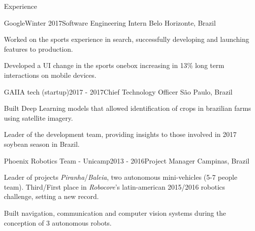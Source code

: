 \documentclass[8pt]{resume}
\newcommand{\tit}[1]{\textit{#1}}
\begin{document}
\begin{rSection}{Experience}

\begin{rSubsection}{Google}{Winter 2017}{Software Engineering Intern}
    {Belo Horizonte, Brazil}
    \item Worked on the sports experience in search, successfully developing and launching features to production.
    \item Developed a UI change in the sports onebox increasing in 13\% long term interactions on mobile devices.
\end{rSubsection}

\begin{rSubsection}{GAIIA tech (startup)}{2017 - 2017}{Chief Technology Officer}
    {São Paulo, Brazil}
    \item Built Deep Learning models that allowed identification of crops in brazilian farms using satellite imagery.
    \item Leader of the development team, providing insights to
        those involved in 2017 soybean season in Brazil.
\end{rSubsection}

\begin{rSubsection}{Phoenix Robotics Team - Unicamp}{2013 - 2016}{Project Manager}
    {Campinas, Brazil}
\item Leader of projects \tit{Piranha}/\tit{Baleia},
        two autonomous mini-vehicles (5-7 people team).
        Third/First place in \tit{Robocore}'s latin-american 2015/2016 robotics
        challenge, setting a new record.
    \item Built navigation, communication and computer vision systems
        during the conception of 3 autonomous robots.
\end{rSubsection}


\end{rSection}
\end{document}
